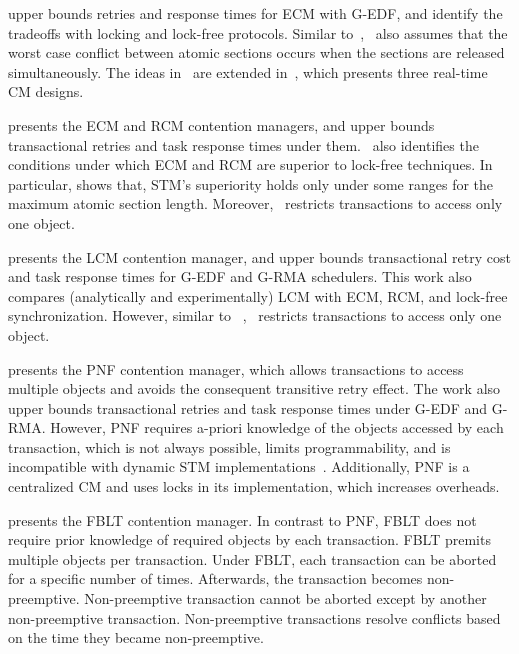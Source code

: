 \documentclass[preprint]{sigplanconf}
\begin{document}
\cite{key-1} upper bounds retries and response times for ECM with G-EDF, and identify the tradeoffs with locking and lock-free protocols. Similar to~\cite{schoeberl2010rttm},~\cite{key-1} also assumes that the worst case conflict between atomic sections occurs when the sections are released simultaneously. The ideas in~\cite{key-1} are extended in~\cite{barrosmanaging}, which presents three real-time CM designs.
 
\cite{stmconcurrencycontrol:emsoft11} presents the ECM and RCM contention managers, and upper bounds transactional retries and task response times under them.~\cite{stmconcurrencycontrol:emsoft11} also identifies the conditions under which ECM and RCM are superior to lock-free techniques. In particular, \cite{stmconcurrencycontrol:emsoft11} shows that, STM's superiority holds only under some ranges for the maximum atomic section length.  Moreover,~\cite{stmconcurrencycontrol:emsoft11} restricts transactions to access only one object.

\cite{lcmdac2012} presents the LCM contention manager, and upper bounds transactional retry cost and task response times for G-EDF and G-RMA schedulers. This work also compares (analytically and experimentally) LCM with ECM, RCM, and lock-free synchronization. However, similar to~
\cite{lcmdac2012},~\cite{stmconcurrencycontrol:emsoft11} restricts transactions to access only one object. 

\cite{pnf_dac_asp} presents the PNF contention manager, which allows transactions to access  multiple objects and avoids the consequent transitive retry effect. The work also upper bounds transactional retries and task response times under G-EDF and G-RMA. However, PNF requires a-priori knowledge of the objects accessed by each transaction, which is not always possible, limits programmability, and is incompatible with dynamic STM implementations~\cite{Herlihy:2003:STM:872035.872048}. Additionally, PNF is a centralized CM and uses locks in its implementation, which increases overheads.

\cite{fblt} presents the FBLT contention manager. In contrast to PNF, FBLT does not require prior knowledge of required objects by each transaction. FBLT premits multiple objects per transaction.
Under FBLT, each transaction can be aborted for a specific number of times. Afterwards, the transaction becomes non-preemptive. Non-preemptive transaction cannot be aborted except by another non-preemptive transaction. Non-preemptive transactions resolve conflicts based on the time they became non-preemptive. 
\end{document}
